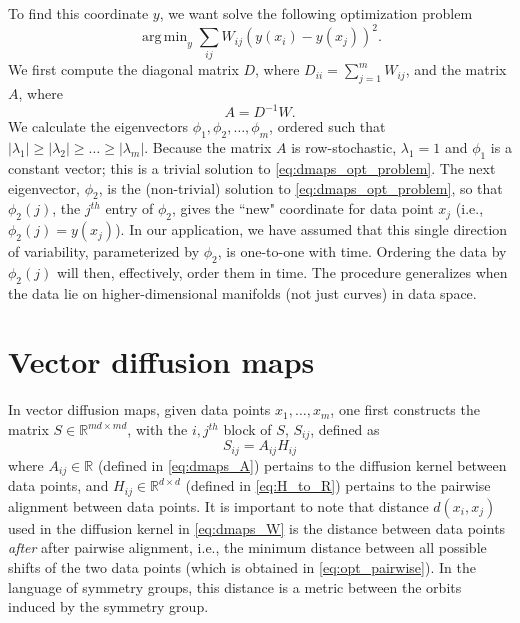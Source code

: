 \documentclass{pnastwo}
\DeclareMathOperator*{\argmin}{arg\,min}
\begin{document}
\begin{article}
\begin{materials}
To find this coordinate $y$, we want solve the following optimization problem \cite{Belkin2003}
\begin{equation} \label{eq:dmaps_opt_problem}
\argmin_{y} \sum_{ij} W_{ij} (y(x_i) - y(x_j))^2.
\end{equation}
%
We first compute the diagonal matrix $D$, where $D_{ii} = \sum_{j=1}^{m} W_{ij}$, and the matrix $A$, where
\begin{equation} \label{eq:dmaps_A}
A = D^{-1} W.
\end{equation}
%
We calculate the eigenvectors $\phi_1, \phi_2, \dots, \phi_m$, ordered such that $|\lambda_1| \ge |\lambda_2| \ge \dots \ge |\lambda_m|$.
%
%
Because the matrix $A$ is row-stochastic, $\lambda_1=1$ and $\phi_1$ is a constant vector; this is a trivial solution to \eqref{eq:dmaps_opt_problem}.
%
%
The next eigenvector, $\phi_2$, is the (non-trivial) solution to \eqref{eq:dmaps_opt_problem}, so that $\phi_2(j)$, the $j^{th}$ entry of $\phi_2$, gives the ``new" coordinate for data point $x_j$ (i.e., $\phi_2(j) = y(x_j)$).
%
In our application, we have assumed that this single direction of variability, parameterized by $\phi_2$, is one-to-one with time.
%
Ordering the data by $\phi_2(j)$ will then, effectively, order them in time.
%
The procedure generalizes when the data lie on higher-dimensional manifolds (not just curves) in data space.

\section{Vector diffusion maps\cite{singer2012vector}}

In vector diffusion maps, given data points $x_1, \dots, x_m$, one first constructs the matrix $S \in \mathbb{R}^{md \times md}$, with the $i,j^{th}$ block of $S$, $S_{ij}$, defined as
\begin{equation} \label{eq:vdm_S}
	S_{ij} = A_{ij} H_{ij}
\end{equation}
%
where $A_{ij} \in \mathbb{R}$ (defined in \eqref{eq:dmaps_A}) pertains to the diffusion kernel between data points, and $H_{ij} \in \mathbb{R}^{d \times d}$ (defined in \eqref{eq:H_to_R}) pertains to the pairwise alignment between data points.
%
It is important to note that distance $d(x_i, x_j)$ used in the diffusion kernel in \eqref{eq:dmaps_W} is the distance between data points {\em after} after pairwise alignment, i.e., the minimum distance between all possible shifts of the two data points (which is obtained in \eqref{eq:opt_pairwise}).
%
In the language of symmetry groups, this distance is a metric between the orbits induced by the symmetry group.


\end{materials}
\end{article}
\end{document}
